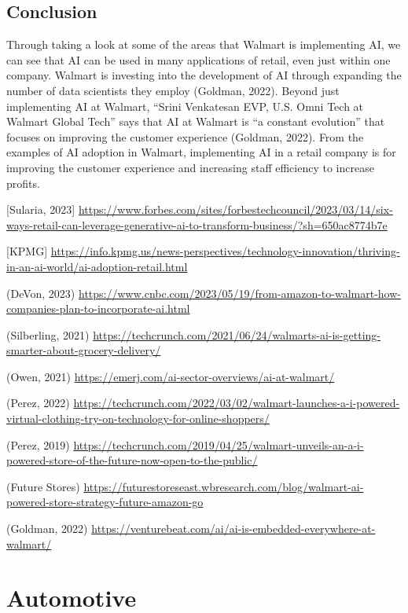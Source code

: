 \documentclass[
]{article}
\begin{document}
\hypertarget{conclusion}{%
\subsection{Conclusion}\label{conclusion}}

Through taking a look at some of the areas that Walmart is implementing AI, we can see that AI can be used in many applications of retail, even just within one company. Walmart is investing into the development of AI through expanding the number of data scientists they employ (Goldman, 2022). Beyond just implementing AI at Walmart, ``Srini Venkatesan EVP, U.S. Omni Tech at Walmart Global Tech'' says that AI at Walmart is ``a constant evolution'' that focuses on improving the customer experience (Goldman, 2022). From the examples of AI adoption in Walmart, implementing AI in a retail company is for improving the customer experience and increasing staff efficiency to increase profits.

{[}Sularia, 2023{]} \url{https://www.forbes.com/sites/forbestechcouncil/2023/03/14/six-ways-retail-can-leverage-generative-ai-to-transform-business/?sh=650ac8774b7e}

{[}KPMG{]} \url{https://info.kpmg.us/news-perspectives/technology-innovation/thriving-in-an-ai-world/ai-adoption-retail.html}

(DeVon, 2023) \url{https://www.cnbc.com/2023/05/19/from-amazon-to-walmart-how-companies-plan-to-incorporate-ai.html}

(Silberling, 2021) \url{https://techcrunch.com/2021/06/24/walmarts-ai-is-getting-smarter-about-grocery-delivery/}

(Owen, 2021) \url{https://emerj.com/ai-sector-overviews/ai-at-walmart/}

(Perez, 2022) \url{https://techcrunch.com/2022/03/02/walmart-launches-a-i-powered-virtual-clothing-try-on-technology-for-online-shoppers/}

(Perez, 2019) \url{https://techcrunch.com/2019/04/25/walmart-unveils-an-a-i-powered-store-of-the-future-now-open-to-the-public/}

(Future Stores)
\url{https://futurestoreseast.wbresearch.com/blog/walmart-ai-powered-store-strategy-future-amazon-go}

(Goldman, 2022) \url{https://venturebeat.com/ai/ai-is-embedded-everywhere-at-walmart/}

\hypertarget{automotive}{%
\section*{Automotive}\label{automotive}}
\end{document}
